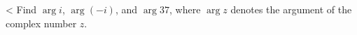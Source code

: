 <%
Find $\arg i$, $\arg(-i)$, and $\arg 37$, where $\arg z$ denotes the argument of the complex number $z$.
